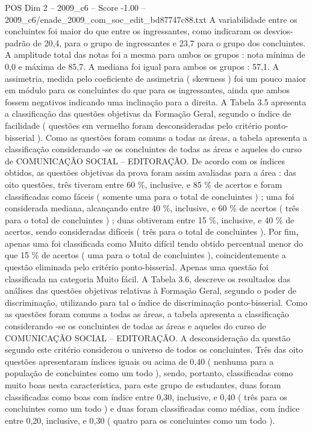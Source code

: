 \begin{textsample}{POS Dim 2 – 2009\_c6 – Score -1.00 – 2009\_c6/enade\_2009\_com\_soc\_edit\_bd87747c88.txt}
A variabilidade entre os concluintes foi maior do que entre os ingressantes, como indicaram os desvios-padrão de 20,4, para o grupo de ingressantes e 23,7 para o grupo dos concluintes.
A amplitude total das notas foi a mesma para ambos os grupos : nota mínima de 0,0 e máxima de 85,7.
A mediana foi igual para ambos os grupos : 57,1.
A assimetria, medida pelo coeficiente de assimetria ( skewness ) foi um pouco maior em módulo para os concluintes do que para os ingressantes, ainda que ambos fossem negativos indicando uma inclinação para a direita.
A Tabela 3.5 apresenta a classificação das questões objetivas da Formação Geral, segundo o índice de facilidade ( questões em vermelho foram desconsideradas pelo critério ponto-bisserial ).
Como as questões foram comuns a todas as áreas, a tabela apresenta a classificação considerando -se os concluintes de todas as áreas e aqueles do curso de COMUNICAÇÃO SOCIAL – EDITORAÇÃO.
De acordo com os índices obtidos, as questões objetivas da prova foram assim avaliadas para a área : das oito questões, três tiveram entre 60 \%, inclusive, e 85 \% de acertos e foram classificadas como fáceis ( somente uma para o total de concluintes ) ; uma foi considerada mediana, alcançando entre 40 \%, inclusive, e 60 \% de acertos ( três para o total de concluintes ) ; duas obtiveram entre 15 \%, inclusive, e 40 \% de acertos, sendo consideradas difíceis ( três para o total de concluintes ).
Por fim, apenas uma foi classificada como Muito difícil tendo obtido percentual menor do que 15 \% de acertos ( uma para o total de concluintes ), coincidentemente a questão eliminada pelo critério ponto-bisserial.
Apenas uma questão foi classificada na categoria Muito fácil.
A Tabela 3.6, descreve os resultados das análises das questões objetivas relativas à Formação Geral, segundo o poder de discriminação, utilizando para tal o índice de discriminação ponto-bisserial.
Como as questões foram comuns a todas as áreas, a tabela apresenta a classificação considerando -se os concluintes de todas as áreas e aqueles do curso de COMUNICAÇÃO SOCIAL – EDITORAÇÃO.
A desconsideração da questão segundo este critério considerou o universo de todos os concluintes.
Três das oito questões apresentaram índices iguais ou acima de 0,40 ( nenhuma para a população de concluintes como um todo ), sendo, portanto, classificadas como muito boas nesta característica, para este grupo de estudantes, duas foram classificadas como boas com índice entre 0,30, inclusive, e 0,40 ( três para os concluintes como um todo ) e duas foram classificadas como médias, com índice entre 0,20, inclusive, e 0,30 ( quatro para os concluintes como um todo ).

\end{textsample}

